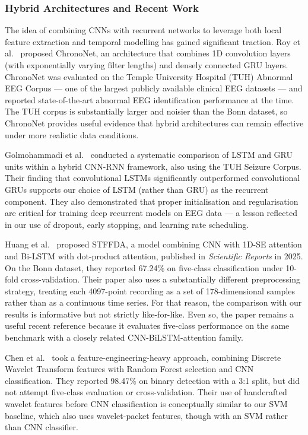 \subsubsection{Hybrid Architectures and Recent Work}

The idea of combining CNNs with recurrent networks to leverage both local feature extraction and temporal modelling has gained significant traction. Roy et al.\ \cite{roy2019} proposed ChronoNet, an architecture that combines 1D convolution layers (with exponentially varying filter lengths) and densely connected GRU layers. ChronoNet was evaluated on the Temple University Hospital (TUH) Abnormal EEG Corpus \cite{obeid2016} --- one of the largest publicly available clinical EEG datasets --- and reported state-of-the-art abnormal EEG identification performance at the time. The TUH corpus is substantially larger and noisier than the Bonn dataset, so ChronoNet provides useful evidence that hybrid architectures can remain effective under more realistic data conditions.

Golmohammadi et al.\ \cite{golmohammadi2019} conducted a systematic comparison of LSTM and GRU units within a hybrid CNN-RNN framework, also using the TUH Seizure Corpus. Their finding that convolutional LSTMs significantly outperformed convolutional GRUs supports our choice of LSTM (rather than GRU) as the recurrent component. They also demonstrated that proper initialisation and regularisation are critical for training deep recurrent models on EEG data --- a lesson reflected in our use of dropout, early stopping, and learning rate scheduling.

Huang et al.\ \cite{huang2025} proposed STFFDA, a model combining CNN with 1D-SE attention and Bi-LSTM with dot-product attention, published in \textit{Scientific Reports} in 2025. On the Bonn dataset, they reported 67.24\% on five-class classification under 10-fold cross-validation. Their paper also uses a substantially different preprocessing strategy, treating each 4097-point recording as a set of 178-dimensional samples rather than as a continuous time series. For that reason, the comparison with our results is informative but not strictly like-for-like. Even so, the paper remains a useful recent reference because it evaluates five-class performance on the same benchmark with a closely related CNN-BiLSTM-attention family.

Chen et al.\ \cite{chen2023} took a feature-engineering-heavy approach, combining Discrete Wavelet Transform features with Random Forest selection and CNN classification. They reported 98.47\% on binary detection with a 3:1 split, but did not attempt five-class evaluation or cross-validation. Their use of handcrafted wavelet features before CNN classification is conceptually similar to our SVM baseline, which also uses wavelet-packet features, though with an SVM rather than CNN classifier.

